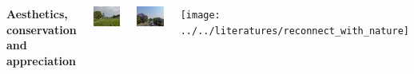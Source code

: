\documentclass[11pt,ignorenonframetext,aspectratio=169]{beamer}
\newcommand{\bcolumns}{\begin{columns}[T, onlytextwidth]}
\newcommand{\ecolumns}{\end{columns}}
\begin{document}
\begin{frame}{}
\protect\hypertarget{section-1}{}
\bcolumns


\textbf{Aesthetics, conservation and appreciation}

\begin{center}\includegraphics[width=0.65\linewidth]{../images/wheat_trial_plots} \end{center}

\begin{center}\includegraphics[width=0.56\linewidth]{../images/jacaranda_kathmandu} \end{center}


\begin{center}\texttt{[image: ../../literatures/reconnect\_with\_nature]} \end{center}

\ecolumns
\end{frame}
\end{document}
